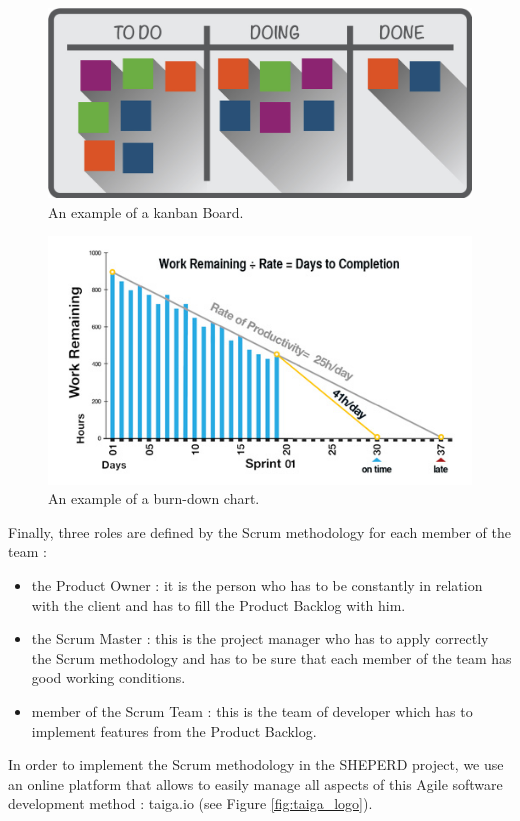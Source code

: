 \documentclass[a4paper]{report}
\begin{document}
\vspace{1cm}

\begin{figure}[H]
	\centering
	\includegraphics[width=0.7\linewidth]{image/kanban-1.jpg}
	\caption{An example of a kanban Board.}
	\label{fig:kanban}
\end{figure}

\begin{figure}[H]
	\centering
	\includegraphics[width=0.7\linewidth]{image/burndown-chart-formula.jpg}
	\caption{An example of a burn-down chart.}
	\label{fig:burndown_chart}
\end{figure}

Finally, three roles are defined by the Scrum methodology for each member of the team :

\begin{itemize}
	\item the Product Owner : it is the person who has to be constantly in relation with the client and has to fill the Product Backlog with him.
	\item the Scrum Master : this is the project manager who has to apply correctly the Scrum methodology and has to be sure that each member of the team has good working conditions.
	\item member of the Scrum Team : this is the team of developer which has to implement features from the Product Backlog.\\
\end{itemize}

In order to implement the Scrum methodology in the SHEPERD project, we use an online platform that allows to easily manage all aspects of this Agile software development method : taiga.io (see Figure \ref{fig:taiga_logo}).
\end{document}
